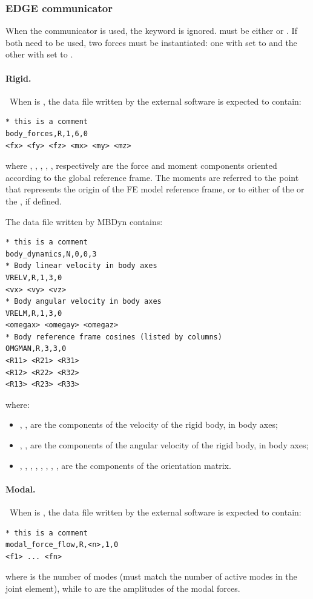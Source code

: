 \subsubsection{EDGE communicator}
When the  communicator is used,
the  keyword is ignored.
 must be either  or .
If both need to be used, two  forces must be instantiated:
one with  set to 
and the other with  set to .

\paragraph{Rigid.} \
When  is , the data file written by the external software
is expected to contain:
\begin{verbatim}
* this is a comment
body_forces,R,1,6,0
<fx> <fy> <fz> <mx> <my> <mz>
\end{verbatim}
where , , , , , 
respectively are the force and moment components
oriented according to the global reference frame.
The moments are referred to the point that represents the origin
of the FE model reference frame, or to either of
the  or the , if defined.

The data file written by MBDyn contains:
\begin{verbatim}
* this is a comment
body_dynamics,N,0,0,3
* Body linear velocity in body axes
VRELV,R,1,3,0
<vx> <vy> <vz>
* Body angular velocity in body axes
VRELM,R,1,3,0
<omegax> <omegay> <omegaz>
* Body reference frame cosines (listed by columns)
OMGMAN,R,3,3,0
<R11> <R21> <R31>
<R12> <R22> <R32>
<R13> <R23> <R33>
\end{verbatim}
where:
\begin{itemize}
\item {}, ,  are the components of the velocity
	of the rigid body, in body axes;
\item {}, ,  are the components
	of the angular velocity of the rigid body, in body axes;
\item {}, , , , , ,
	, ,  are the components
	of the orientation matrix.
\end{itemize}

\paragraph{Modal.} \
When  is , the data file written by the external software
is expected to contain:
\begin{verbatim}
* this is a comment
modal_force_flow,R,<n>,1,0
<f1> ... <fn>
\end{verbatim}
where  is the number of modes (must match the number of active modes
in the  joint element), while  to  are the amplitudes
of the modal forces.

